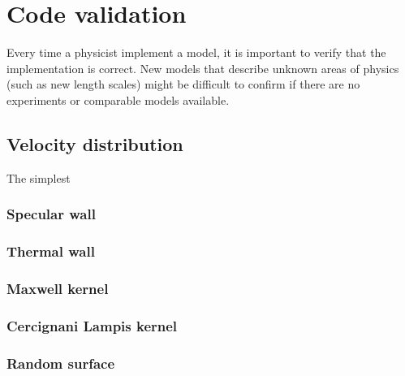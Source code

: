 \section{Code validation}
Every time a physicist implement a model, it is important to verify that the implementation is correct. New models that describe unknown areas of physics (such as new length scales) might be difficult to confirm if there are no experiments or comparable models available. 
\subsection{Velocity distribution}
The simplest 
\subsubsection{Specular wall}
\subsubsection{Thermal wall}
\subsubsection{Maxwell kernel}
\subsubsection{Cercignani Lampis kernel}
\subsubsection{Random surface}
